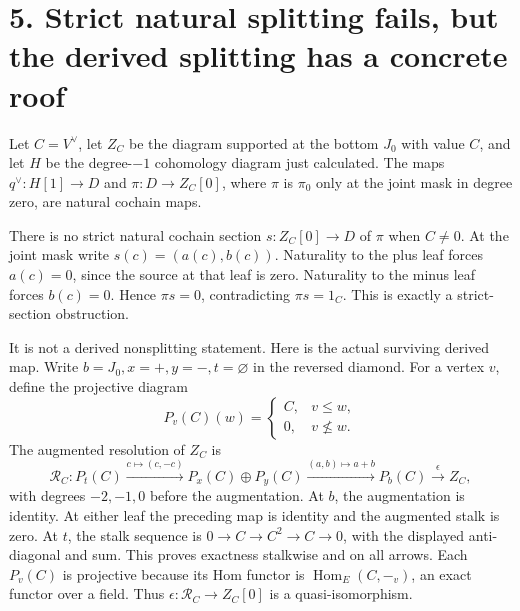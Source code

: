 \section{5. Strict natural splitting fails, but the derived splitting
has a concrete
roof}\label{TranscriptStage:proof03:strict-natural-splitting-fails-but-the-derived-splitting-has-a-concrete-roof}

Let \(C=V^\vee\), let \(Z_C\) be the diagram supported at the bottom
\(J_0\) with value \(C\), and let \(H\) be the degree-\(-1\) cohomology
diagram just calculated. The maps \(q^\vee:H[1]\to D\) and
\(\pi:D\to Z_C[0]\), where \(\pi\) is \(\pi_0\) only at the joint mask
in degree zero, are natural cochain maps.

There is no strict natural cochain section \(s:Z_C[0]\to D\) of \(\pi\)
when \(C\ne0\). At the joint mask write \(s(c)=(a(c),b(c))\). Naturality
to the plus leaf forces \(a(c)=0\), since the source at that leaf is
zero. Naturality to the minus leaf forces \(b(c)=0\). Hence \(\pi s=0\),
contradicting \(\pi s=1_C\). This is exactly a strict-section
obstruction.

It is not a derived nonsplitting statement. Here is the actual surviving
derived map. Write \(b=J_0,x=+,y=-,t=\varnothing\) in the reversed
diamond. For a vertex \(v\), define the projective diagram \[
P_v(C)(w)=\begin{cases}C,&v\le w,\\0,&v\nleq w.\end{cases}
\] The augmented resolution of \(Z_C\) is \[
\mathcal R_C:
P_t(C)\xrightarrow{c\mapsto(c,-c)}
P_x(C)\oplus P_y(C)\xrightarrow{(a,b)\mapsto a+b}
P_b(C)\xrightarrow{\epsilon}Z_C,
\] with degrees \(-2,-1,0\) before the augmentation. At \(b\), the
augmentation is identity. At either leaf the preceding map is identity
and the augmented stalk is zero. At \(t\), the stalk sequence is
\(0\to C\to C^2\to C\to0\), with the displayed anti-diagonal and sum.
This proves exactness stalkwise and on all arrows. Each \(P_v(C)\) is
projective because its Hom functor is \(\operatorname{Hom}_E(C,-_v)\),
an exact functor over a field. Thus \(\epsilon:\mathcal R_C\to Z_C[0]\)
is a quasi-isomorphism.

